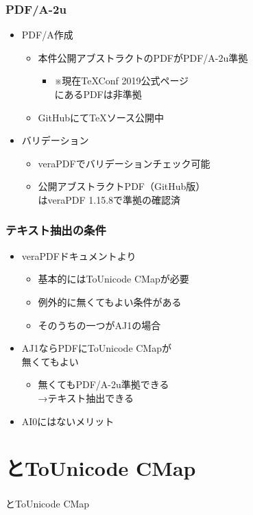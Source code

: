 \begin{frame}\frametitle{PDF/A-2u}
  \begin{itemize}
  \item PDF/A作成
    \begin{itemize}
    \item 本件公開アブストラクトのPDFがPDF/A-2u準拠
      \begin{itemize}
      \item ※現在TeXConf 2019公式ページ \\
        にあるPDFは非準拠
      \end{itemize}
    \item GitHubにて\TeX ソース公開中
    \end{itemize}
  \item バリデーション
    \begin{itemize}
    \item veraPDFでバリデーションチェック可能
    \item 公開アブストラクトPDF（GitHub版） \\
      はveraPDF 1.15.8で準拠の確認済
    \end{itemize}
  \end{itemize}
\end{frame}

\begin{frame}\frametitle{テキスト抽出の条件}
  \begin{itemize}
  \item veraPDFドキュメントより
    \begin{itemize}
    \item 基本的にはToUnicode CMapが必要
    \item 例外的に無くてもよい条件がある
    \item そのうちの一つがAJ1の場合
    \end{itemize}
  \item AJ1ならPDFにToUnicode CMapが \\
    \alert{無くてもよい}
    \begin{itemize}
    \item 無くてもPDF/A-2u準拠できる \\
      →テキスト抽出できる
    \end{itemize}
  \item AI0にはないメリット
  \end{itemize}
\end{frame}

\section{\LuaTeX とToUnicode CMap}
\begin{frame}\frametitle{}
  \centering
  \LuaTeX とToUnicode CMap
\end{frame}

